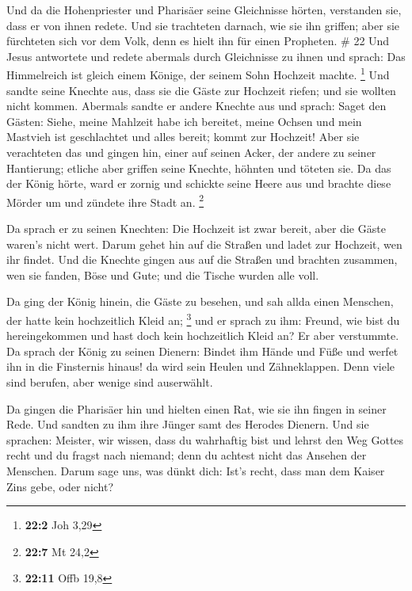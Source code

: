  Und da die Hohenpriester und Pharisäer seine Gleichnisse
hörten, verstanden sie, dass er von ihnen redete.  Und
sie trachteten darnach, wie sie ihn griffen; aber sie fürchteten sich
vor dem Volk, denn es hielt ihn für einen Propheten. \# 22
 Und Jesus antwortete und redete abermals durch
Gleichnisse zu ihnen und sprach:  Das Himmelreich ist
gleich einem Könige, der seinem Sohn Hochzeit machte. \footnote{\textbf{22:2}
  Joh 3,29}  Und sandte seine Knechte aus, dass sie die
Gäste zur Hochzeit riefen; und sie wollten nicht kommen. 
Abermals sandte er andere Knechte aus und sprach: Saget den Gästen:
Siehe, meine Mahlzeit habe ich bereitet, meine Ochsen und mein Mastvieh
ist geschlachtet und alles bereit; kommt zur Hochzeit! 
Aber sie verachteten das und gingen hin, einer auf seinen Acker, der
andere zu seiner Hantierung;  etliche aber griffen seine
Knechte, höhnten und töteten sie.  Da das der König hörte,
ward er zornig und schickte seine Heere aus und brachte diese Mörder um
und zündete ihre Stadt an. \footnote{\textbf{22:7} Mt 24,2}

 Da sprach er zu seinen Knechten: Die Hochzeit ist zwar
bereit, aber die Gäste waren's nicht wert.  Darum gehet
hin auf die Straßen und ladet zur Hochzeit, wen ihr findet.
 Und die Knechte gingen aus auf die Straßen und brachten
zusammen, wen sie fanden, Böse und Gute; und die Tische wurden alle
voll.

 Da ging der König hinein, die Gäste zu besehen, und sah
allda einen Menschen, der hatte kein hochzeitlich Kleid an; \footnote{\textbf{22:11}
  Offb 19,8}  und er sprach zu ihm: Freund, wie bist du
hereingekommen und hast doch kein hochzeitlich Kleid an? Er aber
verstummte.  Da sprach der König zu seinen Dienern:
Bindet ihm Hände und Füße und werfet ihn in die Finsternis hinaus! da
wird sein Heulen und Zähneklappen.  Denn viele sind
berufen, aber wenige sind auserwählt.

 Da gingen die Pharisäer hin und hielten einen Rat, wie
sie ihn fingen in seiner Rede.  Und sandten zu ihm ihre
Jünger samt des Herodes Dienern. Und sie sprachen: Meister, wir wissen,
dass du wahrhaftig bist und lehrst den Weg Gottes recht und du fragst
nach niemand; denn du achtest nicht das Ansehen der Menschen.
 Darum sage uns, was dünkt dich: Ist's recht, dass man
dem Kaiser Zins gebe, oder nicht?

